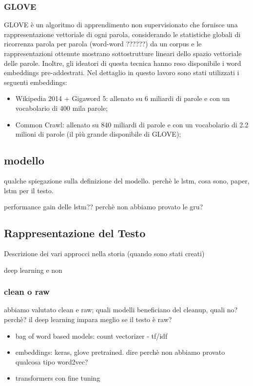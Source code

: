 \subsubsection{GLOVE}
GLOVE \cite{pennington2014glove} è un algoritmo di apprendimento non supervisionato che fornisce una rappresentazione vettoriale di ogni parola, considerando le statistiche globali di ricorrenza parola per parola (word-word ??????) da un corpus e le rappresentazioni ottenute mostrano sottostrutture lineari dello spazio vettoriale delle parole. Inoltre, gli ideatori di questa tecnica hanno reso disponibile i word embeddings pre-addestrati.
Nel dettaglio in questo lavoro sono stati utilizzati i seguenti embeddings:
\begin{itemize}
	\item Wikipedia 2014 + Gigaword 5: allenato su 6 miliardi di parole e con un vocabolario di 400 mila parole;
	\item Common Crawl: allenato su 840 miliardi di parole e con un vocabolario di 2.2 milioni di parole (il più grande disponibile di GLOVE);
\end{itemize}

\subsection{modello}
qualche spiegazione sulla definizione del modello.
perchè le lstm, cosa sono, paper, lstm per il testo.

performance gain delle lstm??
perchè non abbiamo provato le gru?

\subsection{Rappresentazione del Testo}
Descrizione dei vari approcci nella storia (quando sono stati creati)

deep learning e non

\subsubsection{clean o raw}
abbiamo valutato clean e raw; quali modelli beneficiano del cleanup, quali no?
perchè? il deep learning impara meglio se il testo è raw?

\begin{itemize}
    \item bag of word based models: count vectorizer - tf/idf
    \item embeddings: keras, glove pretrained. dire perchè non abbiamo provato
    qualcosa tipo word2vec?
    \item transformers con fine tuning
\end{itemize}

